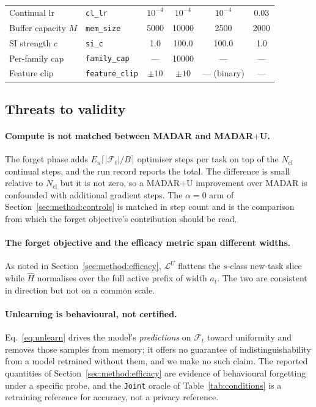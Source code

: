 \begin{table}[t]
\begin{tabular}{@{}llcccc@{}}
    Continual lr               & \texttt{cl\_lr}          & $10^{-4}$ & $10^{-4}$ & $10^{-4}$ & $0.03$ \\
    Buffer capacity $M$        & \texttt{mem\_size}       & 5000 & 10000 & 2500 & 2000 \\
    SI strength $c$            & \texttt{si\_c}           & 1.0 & 100.0 & 100.0 & 1.0 \\
    Per-family cap             & \texttt{family\_cap}     & --- & 10000 & --- & --- \\
    Feature clip               & \texttt{feature\_clip}   & $\pm10$ & $\pm10$ & --- (binary) & --- \\
    \bottomrule
  \end{tabular}
\end{table}

\subsection{Threats to validity}
\label{sec:method:threats}

\paragraph{Compute is not matched between MADAR and MADAR${+}$U.}
The forget phase adds $E_u \lceil |\mathcal{F}_t| / B \rceil$ optimiser steps per
task on top of the $N_{\mathrm{cl}}$ continual steps, and the run record reports
the total. The difference is small relative to $N_{\mathrm{cl}}$ but it is not
zero, so a MADAR${+}$U improvement over MADAR is confounded with additional
gradient steps. The $\alpha = 0$ arm of Section~\ref{sec:method:controls} is
matched in step count and is the comparison from which the forget objective's
contribution should be read.

\paragraph{The forget objective and the efficacy metric span different widths.}
As noted in Section~\ref{sec:method:efficacy}, $\mathcal{L}^U$ flattens the
$s$-class new-task slice while $\widehat{H}$ normalises over the full active
prefix of width $a_t$. The two are consistent in direction but not on a common
scale.

\paragraph{Unlearning is behavioural, not certified.}
Eq.~\eqref{eq:unlearn} drives the model's \emph{predictions} on $\mathcal{F}_t$
toward uniformity and removes those samples from memory; it offers no guarantee
of indistinguishability from a model retrained without them, and we make no such
claim. The reported quantities of Section~\ref{sec:method:efficacy} are evidence
of behavioural forgetting under a specific probe, and the \texttt{Joint} oracle
of Table~\ref{tab:conditions} is a retraining reference for accuracy, not a
privacy reference.

